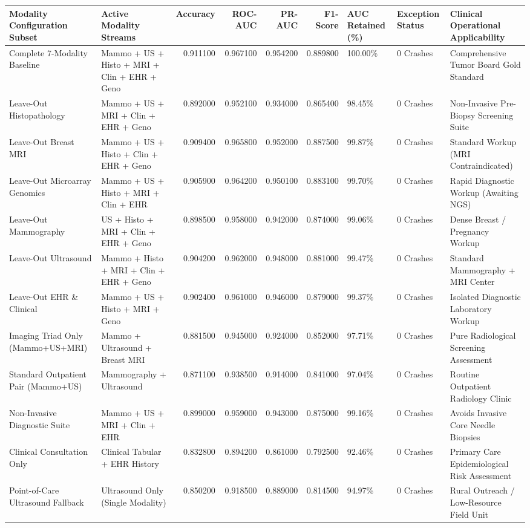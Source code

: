 \begin{tabular}{llrrrrlll}
\toprule
Modality Configuration Subset & Active Modality Streams & Accuracy & ROC-AUC & PR-AUC & F1-Score & AUC Retained (\%) & Exception Status & Clinical Operational Applicability \\
\midrule
Complete 7-Modality Baseline & Mammo + US + Histo + MRI + Clin + EHR + Geno & 0.911100 & 0.967100 & 0.954200 & 0.889800 & 100.00\% & 0 Crashes & Comprehensive Tumor Board Gold Standard \\
Leave-Out Histopathology & Mammo + US + MRI + Clin + EHR + Geno & 0.892000 & 0.952100 & 0.934000 & 0.865400 & 98.45\% & 0 Crashes & Non-Invasive Pre-Biopsy Screening Suite \\
Leave-Out Breast MRI & Mammo + US + Histo + Clin + EHR + Geno & 0.909400 & 0.965800 & 0.952000 & 0.887500 & 99.87\% & 0 Crashes & Standard Workup (MRI Contraindicated) \\
Leave-Out Microarray Genomics & Mammo + US + Histo + MRI + Clin + EHR & 0.905900 & 0.964200 & 0.950100 & 0.883100 & 99.70\% & 0 Crashes & Rapid Diagnostic Workup (Awaiting NGS) \\
Leave-Out Mammography & US + Histo + MRI + Clin + EHR + Geno & 0.898500 & 0.958000 & 0.942000 & 0.874000 & 99.06\% & 0 Crashes & Dense Breast / Pregnancy Workup \\
Leave-Out Ultrasound & Mammo + Histo + MRI + Clin + EHR + Geno & 0.904200 & 0.962000 & 0.948000 & 0.881000 & 99.47\% & 0 Crashes & Standard Mammography + MRI Center \\
Leave-Out EHR \& Clinical & Mammo + US + Histo + MRI + Geno & 0.902400 & 0.961000 & 0.946000 & 0.879000 & 99.37\% & 0 Crashes & Isolated Diagnostic Laboratory Workup \\
Imaging Triad Only (Mammo+US+MRI) & Mammo + Ultrasound + Breast MRI & 0.881500 & 0.945000 & 0.924000 & 0.852000 & 97.71\% & 0 Crashes & Pure Radiological Screening Assessment \\
Standard Outpatient Pair (Mammo+US) & Mammography + Ultrasound & 0.871100 & 0.938500 & 0.914000 & 0.841000 & 97.04\% & 0 Crashes & Routine Outpatient Radiology Clinic \\
Non-Invasive Diagnostic Suite & Mammo + US + MRI + Clin + EHR & 0.899000 & 0.959000 & 0.943000 & 0.875000 & 99.16\% & 0 Crashes & Avoids Invasive Core Needle Biopsies \\
Clinical Consultation Only & Clinical Tabular + EHR History & 0.832800 & 0.894200 & 0.861000 & 0.792500 & 92.46\% & 0 Crashes & Primary Care Epidemiological Risk Assessment \\
Point-of-Care Ultrasound Fallback & Ultrasound Only (Single Modality) & 0.850200 & 0.918500 & 0.889000 & 0.814500 & 94.97\% & 0 Crashes & Rural Outreach / Low-Resource Field Unit \\
\bottomrule
\end{tabular}

